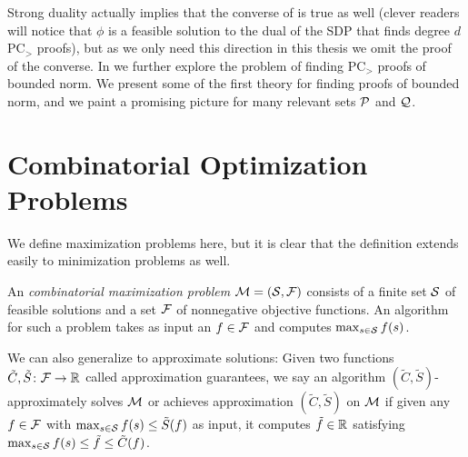 Strong duality actually implies that the converse of  is true as well (clever readers will notice that $\phi$ is a feasible solution to the dual of the SDP that finds degree $d$ PC$_>$ proofs), but as we only need this direction in this thesis we omit the proof of the converse. In
 we further explore the problem of finding PC$_>$ proofs of bounded norm. We present some of the first theory for finding proofs of bounded norm, and we paint a promising picture for many relevant sets $\mathcal P$ and $\mathcal Q$.

\section{Combinatorial Optimization Problems}\label{sec:prelims_comb_opt}
We define maximization problems here, but it is clear that the definition extends easily to minimization problems as well.
\begin{definition}
An \emph{combinatorial maximization problem} \(\mathcal M = (\mathcal S, \mathcal F)\)
consists of a finite set
\(\mathcal S\) of feasible solutions and a set \(\mathcal F\) of nonnegative
objective functions. An algorithm for such a problem takes as input an $f \in \mathcal F$ and computes
$\max_{s \in \mathcal S} f(s)$.

We can also generalize to approximate solutions: Given two functions \(\tilde{C}, \tilde{S} \colon \mathcal F \rightarrow \mathbb R\)
called approximation guarantees, we say
an algorithm \((\tilde{C}, \tilde{S})\)-approximately solves \(\mathcal M\) or achieves approximation $(\tilde{C}, \tilde{S})$ on $\mathcal M$
if given any \(f \in \mathcal F\) with \(\max_{s \in \mathcal S} f(s) \leq \tilde{S}(f)\) as input,
it computes \(\tilde{f}\in \mathbb R\) satisfying
\(\max_{s \in \mathcal S} f(s) \leq \tilde{f} \leq \tilde{C}(f)\).
\end{definition}

